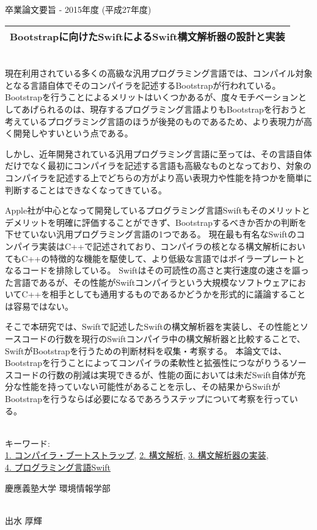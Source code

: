 卒業論文要旨 - 2015年度 (平成27年度)
~ \\
\begin{center}
\begin{Large}
\begin{tabular}{|c|} \hline
Bootstrapに向けたSwiftによるSwift構文解析器の設計と実装
\\ \hline
\end{tabular}
\end{Large}
\end{center}
~  \\

現在利用されている多くの高級な汎用プログラミング言語では、コンパイル対象となる言語自体でそのコンパイラを記述するBootstrapが行われている。
Bootstrapを行うことによるメリットはいくつかあるが、度々モチベーションとしてあげられるのは、現存するプログラミング言語よりもBootstrapを行おうと考えているプログラミング言語のほうが後発のものであるため、より表現力が高く開発しやすいという点である。

しかし、近年開発されている汎用プログラミング言語に至っては、その言語自体だけでなく最初にコンパイラを記述する言語も高級なものとなっており、対象のコンパイラを記述する上でどちらの方がより高い表現力や性能を持つかを簡単に判断することはできなくなってきている。

Apple社が中心となって開発しているプログラミング言語Swiftもそのメリットとデメリットを明確に評価することができず、Bootstrapするべきか否かの判断を下せていない汎用プログラミング言語の1つである。
現在最も有名なSwiftのコンパイラ実装はC++で記述されており、コンパイラの核となる構文解析においてもC++の特徴的な機能を駆使して、より低級な言語ではボイラープレートとなるコードを排除している。
Swiftはその可読性の高さと実行速度の速さを謳った言語であるが、その性能がSwiftコンパイラという大規模なソフトウェアにおいてC++を相手としても通用するものであるかどうかを形式的に議論することは容易ではない。

そこで本研究では、Swiftで記述したSwiftの構文解析器を実装し、その性能とソースコードの行数を現行のSwiftコンパイラ中の構文解析器と比較することで、SwiftがBootstrapを行うための判断材料を収集・考察する。
本論文では、Bootstrapを行うことによってコンパイラの柔軟性と拡張性につながりうるソースコードの行数の削減は実現できるが、性能の面においては未だSwift自体が充分な性能を持っていない可能性があることを示し、その結果からSwiftがBootstrapを行うならば必要になるであろうステップについて考察を行っている。

~ \\
キーワード:\\
\underline{1. コンパイラ・ブートストラップ},
\underline{2. 構文解析},
\underline{3. 構文解析器の実装},\\
\underline{4. プログラミング言語Swift}
\begin{flushright}
慶應義塾大学 環境情報学部\\
~ \\
\begin{Large}
出水 厚輝
\end{Large}
\end{flushright}
